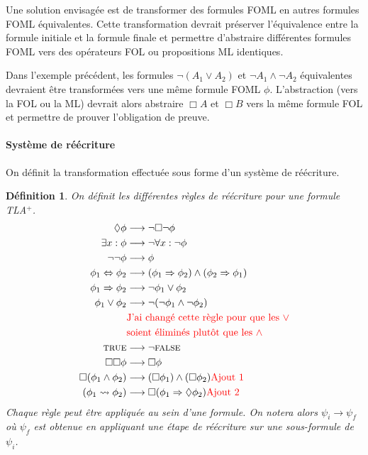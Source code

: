 \documentclass[12pt]{article}
\newcommand{\lra}{\ensuremath{\longrightarrow}}
\newcommand{\raph}[1]{\textcolor{red}{#1}}
\newcommand{\TRUE}{\textsc{true}}
\newcommand{\FALSE}{\textsc{false}}
\newtheorem{defin}{Définition}
\begin{document}
Une solution envisagée est de transformer des formules FOML en autres formules FOML équivalentes.
Cette transformation devrait préserver l'équivalence entre la formule initiale et la formule finale et permettre d'abstraire différentes formules FOML vers des opérateurs FOL ou propositions ML identiques.

Dans l'exemple précédent, les formules $\neg (A_1 \lor A_2)$ et $\neg A_1 \land \neg A_2$ équivalentes devraient être transformées vers une même formule FOML $\phi$.
L'abstraction (vers la FOL ou la ML) devrait alors abstraire $\Box A$ et $\Box B$ vers la même formule FOL et permettre de prouver l'obligation de preuve.


\paragraph{Système de réécriture}

On définit la transformation effectuée sous forme d'un système de réécriture.

\begin{defin}
  On définit les différentes règles de réécriture pour une formule TLA$^+$.
  \begin{align*}
    \Diamond \phi & \longrightarrow \neg \Box \neg \phi \\
    \exists x : \phi & \longrightarrow \neg \forall x : \neg \phi \\
    \neg \neg \phi & \longrightarrow \phi \\
    \phi_1 \Leftrightarrow \phi_2 & \longrightarrow (\phi_1 \Rightarrow \phi_2) \land (\phi_2 \Rightarrow \phi_1) \\
    \phi_1 \Rightarrow \phi_2 & \longrightarrow \neg \phi_1 \lor \phi_2 \\
    \phi_1 \lor \phi_2 & \longrightarrow \neg(\neg \phi_1 \land \neg \phi_2) \\
                  & \textup{\raph{J'ai changé cette règle pour que les \(\lor\)}}\\
                  & \textup{\raph{soient éliminés plutôt que les \(\land\)}}\\
    \TRUE & \longrightarrow \neg \FALSE \\
    \Box \Box \phi & \longrightarrow \Box \phi \\
    \Box (\phi_1 \land \phi_2) & \lra (\Box \phi_1) \land (\Box \phi_2) \textup{\raph{Ajout 1}}\\
    (\phi_1 \leadsto \phi_2) & \lra \Box (\phi_1 \Rightarrow \Diamond \phi_2) \textup{\raph{Ajout 2}}
  \end{align*}
  Chaque règle peut être appliquée au sein d'une formule.
  On notera alors \( \psi_i \longrightarrow \psi_f \) où \(\psi_f\) est obtenue en appliquant une étape de réécriture sur une sous-formule de \(\psi_i\).
\end{defin}
\end{document}
